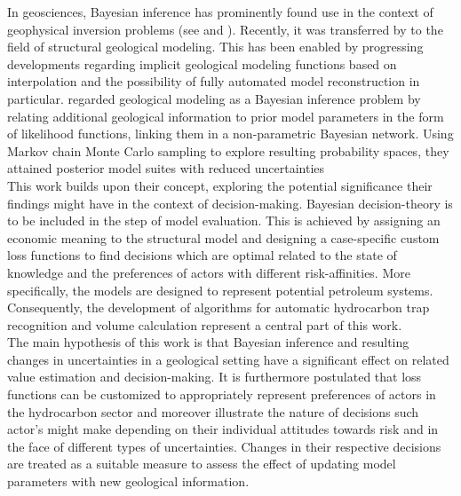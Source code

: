In geosciences, Bayesian inference has prominently found use in the context of geophysical inversion problems (see \citet{tarantola1982inverse, mosegaard2002probabilistic} and \citet{sambridge2002monte}). Recently, it was transferred by \citet{delaVarga2016} to the field of structural geological modeling. This has been enabled by progressing developments regarding implicit geological modeling functions based on interpolation \citep{hillier2014three, mallet1992discrete, lajaunie1997foliation} and the possibility of fully automated model reconstruction in particular.  \citet{delaVarga2016} regarded geological modeling as a Bayesian inference problem by relating additional geological information to prior model parameters in the form of likelihood functions, linking them in a non-parametric Bayesian network. Using Markov chain Monte Carlo sampling to explore resulting probability spaces, they attained posterior model suites with reduced uncertainties \citep{delaVarga2016}\\
This work builds upon their concept, exploring the potential significance their findings might have in the context of decision-making. Bayesian decision-theory is to be included in the step of model evaluation. This is achieved by assigning an economic meaning to the structural model and designing a case-specific custom loss functions to find decisions which are optimal related to the state of knowledge and the preferences of actors with different risk-affinities. More specifically, the models are designed to represent potential petroleum systems. Consequently, the development of algorithms for automatic hydrocarbon trap recognition and volume calculation represent a central part of this work.\\
The main hypothesis of this work is that Bayesian inference and resulting changes in uncertainties in a geological setting have a significant effect on related value estimation and decision-making. It is furthermore postulated that loss functions can be customized to appropriately represent preferences of actors in the hydrocarbon sector and moreover illustrate the nature of decisions such actor's might make depending on their individual attitudes towards risk and in the face of different types of uncertainties. Changes in their respective decisions are treated as a suitable measure to assess the effect of updating model parameters with new geological information.
